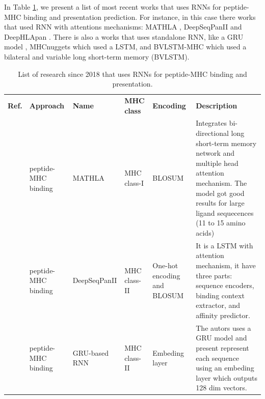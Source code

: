 
In Table \ref{tab:rnn1}, we present a list of most recent works that uses RNNs for peptide-MHC binding and presentation prediction. For instance, in this case there works that used RNN with attentions mechanisms: MATHLA \cite{ye2021mathla}, DeepSeqPanII \cite{liu2021deepseqpanii} and DeepHLApan \cite{wu2019deephlapan}. There is also a works that uses standalone RNN, like a GRU model \cite{heng2021simple}, MHCnuggets which used a LSTM, and BVLSTM-MHC which used a  bilateral and variable long short-term memory (BVLSTM).  \\


\begin{table}[]
	\caption{List of research since 2018 that uses RNNs for peptide-MHC binding and presentation.}
	\label{tab:rnn1}
	\setlength{\tabcolsep}{0.5em} %
	{\renewcommand{\arraystretch}{1.2}%
		
		\begin{tabular}{p{1.3cm}p{1.6cm}p{2cm}p{1.6cm}p{1.9cm}p{4cm}}
		\textbf{Ref.}                               & \textbf{Approach}   & \textbf{Name} & \textbf{MHC class} & \textbf{Encoding}           & \textbf{Description}                                                                                                                                                                                                                       \\
			          \cite{ye2021mathla}        & peptide-MHC binding & MATHLA        & MHC class-I        & BLOSUM                      & Integrates bi-directional long short-term memory network and multiple head attention mechanism. The model got good results for large ligand sequecences (11 to 15 amino acids)                    \\
			
			           \cite{liu2021deepseqpanii} & peptide-MHC binding                     & DeepSeqPanII                      & MHC class-II       & One-hot encoding and BLOSUM & It is a LSTM with attention mechanism, it have three parts:  sequence encoders, binding context extractor, and affinity predictor.                                                        \\
			
			           \cite{heng2021simple}      & peptide-MHC binding                     & GRU-based RNN                     & MHC class-II       & Embeding layer              & The autors uses a GRU model and present represent each sequence using an embeding layer which outputs 128 dim vectors.                                                                  \\
			

\end{tabular}}
\end{table}
